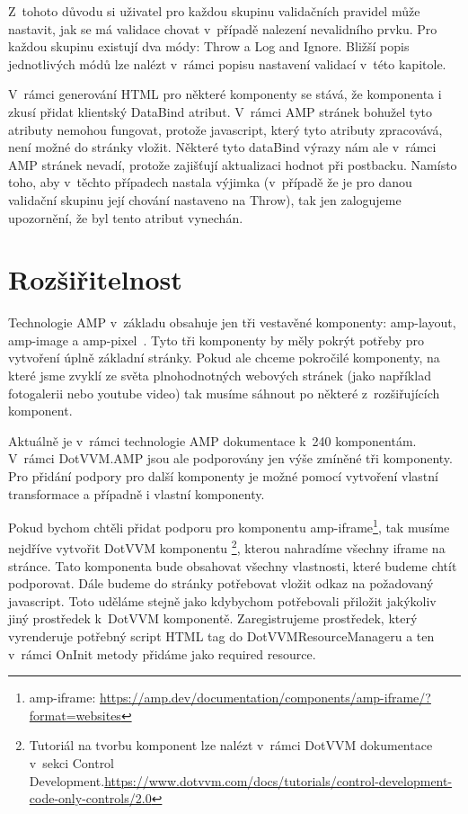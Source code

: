Z~tohoto důvodu si uživatel pro každou skupinu validačních pravidel může nastavit, jak se má validace chovat v~případě nalezení nevalidního prvku. Pro každou skupinu existují dva módy: Throw a Log and Ignore. Bližší popis jednotlivých módů lze nalézt v~rámci popisu nastavení validací v~této kapitole.

V~rámci generování HTML pro některé komponenty se stává, že komponenta i zkusí přidat klientský DataBind atribut. V~rámci AMP stránek bohužel tyto atributy nemohou fungovat, protože javascript, který tyto atributy zpracovává, není možné do stránky vložit. Některé tyto dataBind výrazy nám ale v~rámci AMP stránek nevadí, protože zajišťují aktualizaci hodnot při postbacku. Namísto toho, aby v~těchto případech nastala výjimka (v~případě že je pro danou validační skupinu její chování nastaveno na Throw), tak jen zalogujeme upozornění, že byl tento atribut vynechán.

\section{Rozšiřitelnost}
Technologie AMP v~základu obsahuje jen tři vestavěné komponenty: amp-layout, amp-image a amp-pixel~\cite[Ch.\ 3, p.\ 160]{VzhuruDoAMP}. Tyto tři komponenty by měly pokrýt potřeby pro vytvoření úplně základní stránky. Pokud ale chceme pokročilé komponenty, na které jsme zvyklí ze světa plnohodnotných webových stránek (jako například fotogalerii nebo youtube video) tak musíme sáhnout po některé z~rozšiřujících komponent.

Aktuálně je v~rámci technologie AMP dokumentace k~240 komponentám. V~rámci DotVVM.AMP jsou ale podporovány jen výše zmíněné tři komponenty. Pro přidání podpory pro další komponenty je možné pomocí vytvoření vlastní transformace a případně i vlastní komponenty.

Pokud bychom chtěli přidat podporu pro komponentu amp-iframe\footnote{amp-iframe: \url{https://amp.dev/documentation/components/amp-iframe/?format=websites}}, tak musíme nejdříve vytvořit DotVVM komponentu \footnote{Tutoriál na tvorbu komponent lze nalézt v~rámci DotVVM dokumentace v~sekci Control Development.\newline \url{https://www.dotvvm.com/docs/tutorials/control-development-code-only-controls/2.0}}, kterou nahradíme všechny iframe na stránce. Tato komponenta bude obsahovat všechny vlastnosti, které budeme chtít podporovat.
Dále budeme do stránky potřebovat vložit odkaz na požadovaný javascript. Toto uděláme stejně jako kdybychom potřebovali přiložit jakýkoliv jiný prostředek k~DotVVM komponentě. Zaregistrujeme prostředek, který vyrenderuje potřebný script HTML tag do DotVVMResourceManageru a ten v~rámci OnInit metody přidáme jako required resource.

